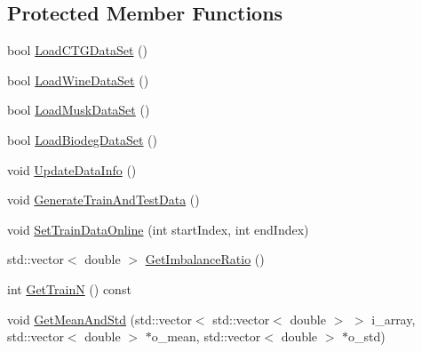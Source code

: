 \subsection*{Protected Member Functions}
\begin{DoxyCompactItemize}
\item 
bool \hyperlink{class_abstract_test_example_acbe2d5227fbf31c3e768d76cd2d49790}{Load\+C\+T\+G\+Data\+Set} ()
\item 
bool \hyperlink{class_abstract_test_example_a29817803c059137758d418b0d4121cd9}{Load\+Wine\+Data\+Set} ()
\item 
bool \hyperlink{class_abstract_test_example_a634004a9e97c8dc30ad14a38f670533e}{Load\+Musk\+Data\+Set} ()
\item 
bool \hyperlink{class_abstract_test_example_aeadf20fc41aaef160c6c054e8c2fb78e}{Load\+Biodeg\+Data\+Set} ()
\item 
void \hyperlink{class_abstract_test_example_ac54e0a9bf455ff3dc3a18d919b13c667}{Update\+Data\+Info} ()
\item 
void \hyperlink{class_abstract_test_example_a384c5ea404dd331a15713049175e56d6}{Generate\+Train\+And\+Test\+Data} ()
\item 
void \hyperlink{class_abstract_test_example_a18d6eb7fa348dc8b1615411d6094b43e}{Set\+Train\+Data\+Online} (int start\+Index, int end\+Index)
\item 
std\+::vector$<$ double $>$ \hyperlink{class_abstract_test_example_a70819a22ccef5619db2bbbd51088701d}{Get\+Imbalance\+Ratio} ()
\item 
int \hyperlink{class_abstract_test_example_ab3caa48f410285ef782896388aa57cef}{Get\+TrainN} () const 
\item 
void \hyperlink{class_abstract_test_example_acae6617be7fdb7c16284c132c850d139}{Get\+Mean\+And\+Std} (std\+::vector$<$ std\+::vector$<$ double $>$ $>$ i\+\_\+array, std\+::vector$<$ double $>$ $\ast$o\+\_\+mean, std\+::vector$<$ double $>$ $\ast$o\+\_\+std)
\end{DoxyCompactItemize}

